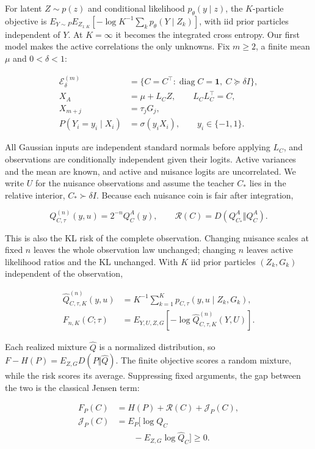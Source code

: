 \documentclass{article}
\begin{document}
For latent \(Z\sim p(z)\) and conditional likelihood
\(p_\theta(y\mid z)\), the \(K\)-particle objective is
\(E_{Y\sim P}E_{Z_{1:K}}[-\log K^{-1}\sum_kp_\theta(Y\mid Z_k)]\), with
iid prior particles independent of \(Y\). At \(K=\infty\) it becomes the
integrated cross entropy. Our first model makes the active correlations
the only unknowns. Fix \(m\ge2\), a finite mean \(\mu\) and
\(0<\delta<1\):

\[
\begin{aligned}
\mathcal E_\delta^{(m)}
&=\{C=C^\top:\operatorname{diag}C=\mathbf1,\ C\succeq\delta I\},\\
X_A&=\mu+L_CZ,\qquad L_CL_C^\top=C,\\
X_{m+j}&=\tau_jG_j,\\
P(Y_i=y_i\mid X_i)&=\sigma(y_iX_i),\qquad y_i\in\{-1,1\}.
\end{aligned}
\tag{1}
\]

All Gaussian inputs are independent standard normals before applying
\(L_C\), and observations are conditionally independent given their
logits. Active variances and the mean are known, and active and nuisance
logits are uncorrelated. We write \(U\) for the nuisance observations
and assume the teacher \(C_*\) lies in the relative interior,
\(C_*\succ\delta I\). Because each nuisance coin is fair after
integration,

\[
Q_{C,\tau}^{(n)}(y,u)=2^{-n}Q_C^A(y),\qquad
\mathcal R(C)=D(Q_{C_*}^A\Vert Q_C^A).
\tag{2}
\]

This is also the KL risk of the complete observation. Changing nuisance
scales at fixed \(n\) leaves the whole observation law unchanged;
changing \(n\) leaves active likelihood ratios and the KL unchanged.
With \(K\) iid prior particles \((Z_k,G_k)\) independent of the
observation,

\[
\begin{aligned}
\widehat Q_{C,\tau,K}^{(n)}(y,u)
&=K^{-1}\sum_{k=1}^Kp_{C,\tau}(y,u\mid Z_k,G_k),\\
F_{n,K}(C;\tau)&=E_{Y,U,Z,G}[-\log\widehat Q_{C,\tau,K}^{(n)}(Y,U)].
\end{aligned}
\tag{3}
\]

Each realized mixture \(\widehat Q\) is a normalized distribution, so
\(F-H(P)=E_{Z,G}D(P\Vert\widehat Q)\). The finite objective scores a
random mixture, while the risk scores its average. Suppressing fixed
arguments, the gap between the two is the classical Jensen term:

\[
\begin{aligned}
F_P(C)&=H(P)+\mathcal R(C)+\mathcal J_P(C),\\
\mathcal J_P(C)&=E_P[\log Q_C\\
&\qquad -E_{Z,G}\log\widehat Q_C]\ge0.
\end{aligned}
\tag{4}
\]
\end{document}
